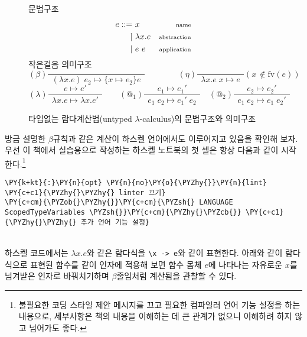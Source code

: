 \begin{figure}
문법구조\vspace*{-4.5ex}
    \begin{align*}
e ::=~& x           & {\scriptsize\textrm{name}} \\
 \mid~& \lambda x.e & {\scriptsize\textrm{abstraction}} \\
 \mid~& e~e         & {\scriptsize\textrm{application}}
\end{align*}
작은걸음 의미구조\vspace*{-1ex}
    \[
{\scriptstyle(\beta)}\frac{}{
~~(\lambda x.e)\;e_2 \longmapsto \{x{\mapsto}e_2\}e~~}
\qquad\qquad
{\scriptstyle(\eta)}\frac{}{
~~\lambda x.e\;x \longmapsto e~~}
({\scriptstyle x\,\notin\mathrm{fv}(e) })
\] \[
{\scriptstyle(\lambda)}\frac{e\longmapsto e'}{
~~\lambda x.e \longmapsto \lambda x.e'~~}
\qquad
{\scriptstyle(\textrm{@}_1)}\frac{e_1\longmapsto e_1'}{
~~e_1\;e_2 \longmapsto e_1'\;e_2~~}
\quad
{\scriptstyle(\textrm{@}_2)}\frac{e_2\longmapsto e_2'}{
~~e_1\;e_2 \longmapsto e_1\;e_2'~~}
\]
\caption{타입없는 람다계산법(untyped $\lambda$-calculus)의 문법구조와 의미구조
         \label{fig:UTLC} }
\end{figure}

    방금 설명한 \(\beta\)규칙과 같은 계산이 하스켈 언어에서도 이루어지고
있음을 확인해 보자. 우선 이 책에서 실습용으로 작성하는 하스켈 노트북의
첫 셀은 항상 다음과 같이 시작한다.\footnote{%
불필요한 코딩 스타일 제안 메시지를 끄고 필요한 컴파일러 언어 기능 설정을 하는 내용으로,
세부사항은 책의 내용을 이해하는 데 큰 관계가 없으니 이해하려 하지 않고 넘어가도 좋다.}

    \begin{tcolorbox}[breakable, size=fbox, boxrule=1pt, pad at break*=1mm,colback=cellbackground, colframe=cellborder, top=.75ex]
\begin{Verbatim}[commandchars=\\\{\}]
\PY{k+kt}{:}\PY{n}{opt} \PY{n}{no}\PY{o}{\PYZhy{}}\PY{n}{lint}                          \PY{c+c1}{\PYZhy{}\PYZhy{} linter 끄기}
\PY{c+cm}{\PYZob{}\PYZhy{}}\PY{c+cm}{\PYZsh{} LANGUAGE ScopedTypeVariables \PYZsh{}}\PY{c+cm}{\PYZhy{}\PYZcb{}} \PY{c+c1}{\PYZhy{}\PYZhy{} 추가 언어 기능 설정}
\end{Verbatim}
\end{tcolorbox}
~\\[-1ex]\noindent
    하스켈 코드에서는 \(\lambda x.e\)와 같은 람다식을
\texttt{\textbackslash{}x\ -\textgreater{}\ e}와 같이 표현한다. 아래와
같이 람다식으로 표현된 함수를 같이 인자에 적용해 보면 함수 몸체 \(e\)에
나타나는 자유로운 \(x\)를 넘겨받은 인자로 바꿔치기하며 \(\beta\)줄임처럼
계산됨을 관찰할 수 있다.

